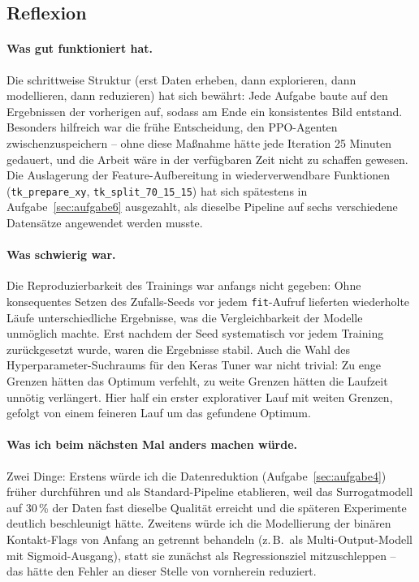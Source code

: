 \subsection{Reflexion}
\label{sec:reflexion}

\paragraph{Was gut funktioniert hat.}
Die schrittweise Struktur (erst Daten erheben, dann explorieren, dann modellieren, dann reduzieren) hat sich bewährt: Jede Aufgabe baute auf den Ergebnissen der vorherigen auf, sodass am Ende ein konsistentes Bild entstand. Besonders hilfreich war die frühe Entscheidung, den PPO-Agenten zwischenzuspeichern -- ohne diese Maßnahme hätte jede Iteration 25 Minuten gedauert, und die Arbeit wäre in der verfügbaren Zeit nicht zu schaffen gewesen. Die Auslagerung der Feature-Aufbereitung in wiederverwendbare Funktionen (\texttt{tk\_prepare\_xy}, \texttt{tk\_split\_70\_15\_15}) hat sich spätestens in Aufgabe~\ref{sec:aufgabe6} ausgezahlt, als dieselbe Pipeline auf sechs verschiedene Datensätze angewendet werden musste.

\paragraph{Was schwierig war.}
Die Reproduzierbarkeit des Trainings war anfangs nicht gegeben: Ohne konsequentes Setzen des Zufalls-Seeds vor jedem \texttt{fit}-Aufruf lieferten wiederholte Läufe unterschiedliche Ergebnisse, was die Vergleichbarkeit der Modelle unmöglich machte. Erst nachdem der Seed systematisch vor jedem Training zurückgesetzt wurde, waren die Ergebnisse stabil. Auch die Wahl des Hyperparameter-Suchraums für den Keras Tuner war nicht trivial: Zu enge Grenzen hätten das Optimum verfehlt, zu weite Grenzen hätten die Laufzeit unnötig verlängert. Hier half ein erster explorativer Lauf mit weiten Grenzen, gefolgt von einem feineren Lauf um das gefundene Optimum.

\paragraph{Was ich beim nächsten Mal anders machen würde.}
Zwei Dinge: Erstens würde ich die Datenreduktion (Aufgabe~\ref{sec:aufgabe4}) früher durchführen und als Standard-Pipeline etablieren, weil das Surrogatmodell auf 30\,\% der Daten fast dieselbe Qualität erreicht und die späteren Experimente deutlich beschleunigt hätte. Zweitens würde ich die Modellierung der binären Kontakt-Flags von Anfang an getrennt behandeln (z.\,B.\ als Multi-Output-Modell mit Sigmoid-Ausgang), statt sie zunächst als Regressionsziel mitzuschleppen -- das hätte den Fehler an dieser Stelle von vornherein reduziert.

